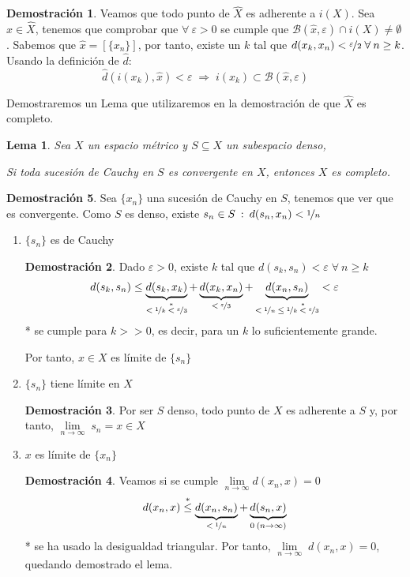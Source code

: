 \documentclass[12pt,twoside]{report}
\newcommand\mc[1]{\mathcal{#1}}
\theoremstyle{azul}
\theoremstyle{azul2}
\theoremstyle{plain}
\newtheorem*{lem}{Lema}
\theoremstyle{definition}
\newtheorem*{dem}{Demostración}
\theoremstyle{remark}
\providecommand{\Lim}[3]{\underset{#1\to#2}{\lim}\; #3}
\begin{document}
\begin{dem}
Veamos que todo punto de $\hat{X}$ es adherente a $i(X)$. Sea $\hat{x} \in \hat{X}$, tenemos que comprobar que $\forall \: \varepsilon > 0$ se cumple que $\mc{B}(\hat{x}, \varepsilon) \cap i(X) \neq \emptyset$. Sabemos que $\hat{x}=[\{x_n\}]$, por tanto, existe un $k$ tal que $d(x_k,x_n) < \nicefrac{\varepsilon}{2} \; \forall \: n \geq k$. Usando la definición de $\hat{d}$:
$$\hat{d}(i(x_k), \hat{x}) < \varepsilon \; \Rightarrow \; i(x_k) \subset \mc{B}(\hat{x}, \varepsilon)$$
\end{dem}
Demostraremos un Lema que utilizaremos en la demostración de que $\hat{X}$ es completo.
\begin{lem}
Sea $X$ un espacio m{\'e}trico y $S \subseteq X$ un subespacio denso, 
\begin{tcolorbox}
Si toda sucesión de Cauchy en $S$ es convergente en $X$, entonces $X$ es completo.
\end{tcolorbox}

\end{lem}
\begin{dem}
Sea $\{x_n\}$ una sucesión de Cauchy en $S$, tenemos que ver que es convergente. Como $S$ es denso, existe $s_n \in S \: : \: d(s_n,x_n) < \nicefrac{1}{n}$
\begin{enumerate}[1)]
    \item $\{s_n\}$ es de Cauchy
    \begin{dem}
    Dado $\varepsilon > 0$, existe $k$ tal que $d(s_k,s_n) < \varepsilon \; \forall \: n \geq k$
    $$d(s_k,s_n)\leq \underbrace{d(s_k,x_k)}_{< \: \nicefrac{1}{k} \: \stackrel{*}{<} \: \nicefrac{\varepsilon}{3}} + \underbrace{d(x_k,x_n)}_{< \: \nicefrac{\varepsilon}{3}} + \underbrace{d(x_n,s_n)}_{< \: \nicefrac{1}{n}\: \leq \: \nicefrac{1}{k} \: \stackrel{*}{<} \: \nicefrac{\varepsilon}{3}} < \varepsilon$$
    * se cumple para $k>>0$, es decir, para un $k$ lo suficientemente grande.
    
    Por tanto, $x \in X$ es límite de $\{ s_n \}$ 
    \end{dem} 
    \item $\{s_n\}$ tiene límite en $X$
    \begin{dem}
    Por ser $S$ denso, todo punto de $X$ es adherente a $S$ y, por tanto, $\Lim{n}{\infty}{s_n}=x\in X$
    \end{dem}
    \item $x$ es límite de $\{x_n\}$
    \begin{dem}
    Veamos si se cumple $ \underset{n \to \infty}{\lim} d(x_n,x) = 0$
    $$d(x_n, x ) \stackrel{*}{\leq} \underbrace{d(x_n,s_n)}_{< \: \nicefrac{1}{n}} + \underbrace{d(s_n,x)}_{ 0 \: (n \to \infty) } $$
    * se ha usado la desigualdad triangular. Por tanto, $\Lim{n}{\infty}{d(x_n,x)}=0$, quedando demostrado el lema.
    \end{dem}
\end{enumerate}
\end{dem}
\end{document}
